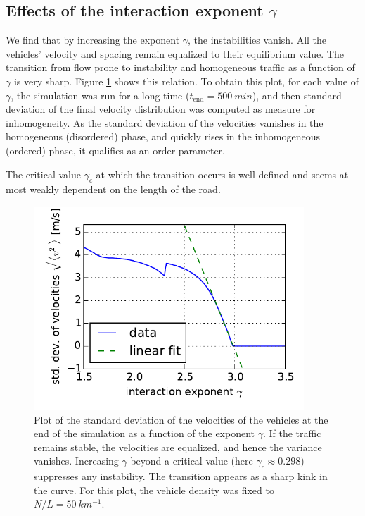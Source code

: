 \subsection{Effects of the interaction exponent $\gamma$}
We find that by increasing the exponent $\gamma$, the instabilities vanish. All the vehicles' velocity and spacing remain equalized to their equilibrium value. The transition from flow prone to instability and homogeneous traffic as a function of $\gamma$ is very sharp. Figure \ref{fig:order_param} shows this relation. To obtain this plot, for each value of $\gamma$, the simulation was run for a long time ($t_\mathrm{end} = \SI{500}{min}$), and then standard deviation of the final velocity distribution was computed as measure for inhomogeneity. As the standard deviation of the velocities vanishes in the homogeneous (disordered) phase, and quickly rises in the inhomogeneous (ordered) phase, it qualifies as an order parameter.

The critical value $\gamma_c$ at which the transition occurs is well defined and seems at most weakly dependent on the length of the road.
\begin{figure}
    \centering
    \includegraphics[width=4in]{../img/order_parameter.pdf}
    \caption{Plot of the standard deviation of the velocities of the vehicles at the end of the simulation as a function of the exponent $\gamma$. If the traffic remains stable, the velocities are equalized, and hence the variance vanishes. Increasing $\gamma$ beyond a critical value (here $\gamma_c \approx 0.298$) suppresses any instability. The transition appears as a sharp kink in the curve. For this plot, the vehicle density was fixed to $N/L=\SI{50}{km^{-1}}$.}
    \label{fig:order_param}
\end{figure}

